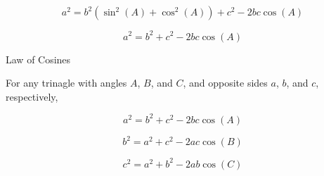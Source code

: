 \documentclass{ximera}
\begin{document}
\[    a^2 = b^2 (\sin^2(A) + \cos^2(A)) +  c^2  - 2 b c \cos(A)   \]


\[    a^2 = b^2  +  c^2  - 2 b c \cos(A)   \]












\begin{theorem}  Law of Cosines



For any trinagle with angles $A$, $B$, and $C$, and opposite sides $a$, $b$, and $c$, respectively, 


\[    a^2 = b^2  +  c^2  - 2 b c \cos(A)   \]

\[    b^2 = a^2  +  c^2  - 2 a c \cos(B)   \]

\[    c^2 = a^2  +  b^2  - 2 a b \cos(C)   \]


\end{theorem}
\end{document}
